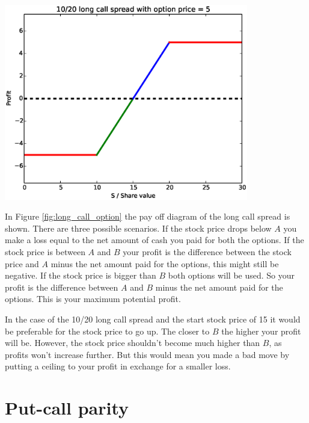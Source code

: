 \documentclass[8 pt]{article}
\newenvironment{Figure}
  {\par\medskip\noindent\minipage{\linewidth}}
  {\endminipage\par\medskip}
\begin{document}
\begin{multicols*}{2}
\begin{Figure}
  \begin{center}
    \includegraphics[width=0.8\textwidth]{graphs/long_call_option.eps}
    \label{fig:long_call_option}
  \end{center}
\end{Figure}

In Figure \ref{fig:long_call_option} the pay off diagram of the long call spread is shown. There are three possible scenarios. If the stock price drops below $A$ you make a loss equal to the net amount of cash you paid for both the options. If the stock price is between $A$ and $B$ your profit is the difference between the stock price and $A$ minus the net amount paid for the options, this might still be negative. If the stock price is bigger than $B$ both options will be used. So your profit is the difference between $A$ and $B$ minus the net amount paid for the options. This is your maximum potential profit.

In the case of the 10/20 long call spread and the start stock price of 15 it would be preferable for the stock price to go up. The closer to $B$ the higher your profit will be. However, the stock price shouldn't become much higher than $B$, as profits won't increase further. But this would mean you made a bad move by putting a ceiling to your profit in exchange for a smaller loss.

\section{Put-call parity}


\end{multicols*}
\end{document}
